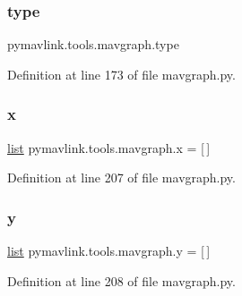 \subsubsection{\texorpdfstring{type}{type}}
{\footnotesize\ttfamily pymavlink.\+tools.\+mavgraph.\+type}



Definition at line 173 of file mavgraph.\+py.

\mbox{\label{namespacepymavlink_1_1tools_1_1mavgraph_a850833f299bc2444a4e9077175f357cb}} 
\subsubsection{\texorpdfstring{x}{x}}
{\footnotesize\ttfamily \mbox{\hyperlink{structlist}{list}} pymavlink.\+tools.\+mavgraph.\+x = \mbox{[}$\,$\mbox{]}}



Definition at line 207 of file mavgraph.\+py.

\mbox{\label{namespacepymavlink_1_1tools_1_1mavgraph_a2083829da277f3d120e2db2239c5ede9}} 
\subsubsection{\texorpdfstring{y}{y}}
{\footnotesize\ttfamily \mbox{\hyperlink{structlist}{list}} pymavlink.\+tools.\+mavgraph.\+y = \mbox{[}$\,$\mbox{]}}



Definition at line 208 of file mavgraph.\+py.

